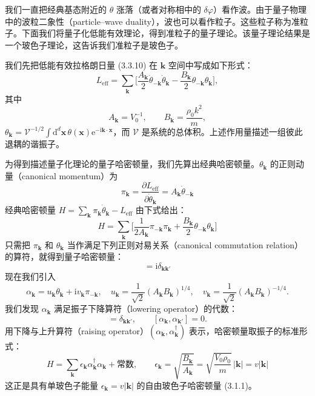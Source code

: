 我们一直把经典基态附近的 $\theta$ 涨落（或者对称相中的 $\delta\varphi$）看作波。由于量子物理中的波粒二象性（particle–wave duality），波也可以看作粒子。这些粒子称为准粒子。下面我们将量子化低能有效理论，得到准粒子的量子理论。该量子理论结果是一个玻色子理论，这告诉我们准粒子是玻色子。

我们先把低能有效拉格朗日量 (3.3.10) 在 $\pmb{k}$ 空间中写成如下形式：
\begin{equation*}
L_{\mathrm{eff}} = \sum_{\pmb{k}}\Big[\frac{A_{\pmb{k}}}{2}\dot{\theta}_{-\pmb{k}}\dot{\theta}_{\pmb{k}} - \frac{B_{\pmb{k}}}{2}\theta_{-\pmb{k}}\theta_{\pmb{k}}\Big],\tag{3.3.15}
\end{equation*}
其中
\begin{equation*}
A_{\pmb{k}} = V_0^{-1},\qquad B_{\pmb{k}} = \frac{\rho_0 k^2}{m},\tag{3.3.16}
\end{equation*}
$\theta_{\pmb{k}} = \mathcal{V}^{-1/2}\int \mathrm{d}^d\pmb{x}\,\theta(\pmb{x})\mathrm{e}^{-\mathrm{i}\pmb{k}\cdot\pmb{x}}$，而 $\mathcal{V}$ 是系统的总体积。上述作用量描述一组彼此退耦的谐振子。

为得到描述量子化理论的量子哈密顿量，我们先算出经典哈密顿量。$\theta_{\pmb{k}}$ 的正则动量（canonical momentum）为
\begin{equation*}
\pi_{\pmb{k}} = \frac{\partial L_{\mathrm{eff}}}{\partial \dot{\theta}_{\pmb{k}}} = A_{\pmb{k}}\dot{\theta}_{-\pmb{k}}
\end{equation*}
经典哈密顿量 $H = \sum_{\pmb{k}}\pi_{\pmb{k}}\dot{\theta}_{\pmb{k}} - L_{\mathrm{eff}}$ 由下式给出：
\begin{equation*}
H = \sum_{\pmb{k}}\Big[\frac{1}{2A_{\pmb{k}}}\pi_{-\pmb{k}}\pi_{\pmb{k}} + \frac{B_{\pmb{k}}}{2}\theta_{-\pmb{k}}\theta_{\pmb{k}}\Big]
\end{equation*}
只需把 $\pi_{\pmb{k}}$ 和 $\theta_{\pmb{k}}$ 当作满足下列正则对易关系（canonical commutation relation）的算符，就得到量子哈密顿量：
\begin{equation*}
[\theta_{\pmb{k}}, \pi_{\pmb{k}'}] = \mathrm{i}\delta_{\pmb{k}\pmb{k}'}
\end{equation*}
现在我们引入
\begin{equation*}
\alpha_{\pmb{k}} = u_{\pmb{k}}\theta_{\pmb{k}} + \mathrm{i}v_{\pmb{k}}\pi_{-\pmb{k}},\quad u_{\pmb{k}} = \frac{1}{\sqrt{2}}(A_{\pmb{k}}B_{\pmb{k}})^{1/4},\quad v_{\pmb{k}} = \frac{1}{\sqrt{2}}(A_{\pmb{k}}B_{\pmb{k}})^{-1/4}.\tag{3.3.17}
\end{equation*}
我们发现 $\alpha_{\pmb{k}}$ 满足振子下降算符（lowering operator）的代数：
\begin{equation*}
[\alpha_{\pmb{k}}, \alpha_{\pmb{k}'}^{\dagger}] = \delta_{\pmb{k}\pmb{k}'},\qquad [\alpha_{\pmb{k}}, \alpha_{\pmb{k}'}] = 0.
\end{equation*}
用下降与上升算符（raising operator）$(\alpha_{\pmb{k}}, \alpha_{\pmb{k}}^{\dagger})$ 表示，哈密顿量取振子的标准形式：
\begin{equation*}
H = \sum_{\pmb{k}}\epsilon_{\pmb{k}}\alpha_{\pmb{k}}^{\dagger}\alpha_{\pmb{k}} + \text{常数},\qquad \epsilon_{\pmb{k}} = \sqrt{\frac{B_{\pmb{k}}}{A_{\pmb{k}}}} = \sqrt{\frac{V_0\rho_0}{m}}\,|\pmb{k}| = v|\pmb{k}|\tag{3.3.18}
\end{equation*}
这正是具有单玻色子能量 $\epsilon_{\pmb{k}} = v|\pmb{k}|$ 的自由玻色子哈密顿量 (3.1.1)。

